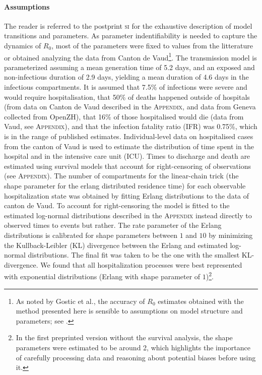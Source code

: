 \paragraph{Assumptions} The reader is referred to the postprint \textsc{si} for the exhaustive description of model transitions and parameters. As parameter indentifiability is needed to capture the dynamics of $R_0$, most of the parameters were fixed to values from the litterature or obtained analyzing the data from Canton de Vaud\footnote[][-3\baselineskip]{As noted by Gostic et al., the accuracy of $R_0$ estimates obtained with the method presented here is sensible to assumptions on model structure and parameters; see .}.
The transmission model is parameterized assuming a mean generation time of 5.2 days\cite{Ganyani:EstimatingGenerationInterval:2020}, and an exposed and non-infectious duration of 2.9 days\cite{He:TemporalDynamicsViral:2020}, yielding a mean duration of 4.6 days in the infectious compartments.  It is assumed that 7.5\% of infections were severe and would require hospitalisation, that 50\% of deaths happened outside of hospitals (from data on Canton de Vaud described in the \textsc{Appendix}, and data from Geneva collected from OpenZH), that 16\% of those hospitalised would die (data from Vaud, see \textsc{Appendix}), and that the infection fatality ratio (IFR) was 0.75\%, which is in the range of published estimates\cite{Verity:EstimatesSeverityCoronavirus:2020, Russell:EstimatingInfectionCase:2020}. Individual-level data on hospitalised cases from the canton of Vaud is used to estimate the distribution of time spent in the hospital and in the intensive care unit (ICU). Times to discharge and death are estimated using survival models that account for right-censoring of observations (see \textsc{Appendix}). The number of compartments for the linear-chain trick (\ie the shape parameter for the erlang distributed residence time) for each observable hospitalization state was obtained by fitting Erlang distributions to the data of canton de Vaud. To account for right-censoring the model is fitted to the estimated log-normal distributions described in the \textsc{Appendix} instead directly to observed times to events but rather. The rate parameter of the Erlang distributions is calibrated for shape parameters between $1$ and $10$ by minimizing the Kullback-Leibler (KL) divergence between the Erlang and estimated log-normal distributions. The final fit was taken to be the one with the smallest KL-divergence. We found that all hospitalization processes were best represented with exponential distributions (Erlang with shape parameter of $1$)\footnote{In the first preprinted version without the survival analysis, the shape parameters were estimated to be around 2, which highlights the importance of carefully processing data and reasoning about potential biases before using it.}.

